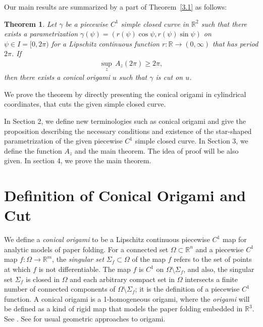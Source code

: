\documentclass{amsart}
\theoremstyle{plain}
\newtheorem*{theorem*}{Theorem}
\theoremstyle{definition}
\theoremstyle{remark}
\begin{document}
Our main results are summarized by a part of Theorem~\ref{3.1} as follows:
\begin{theorem*} %
Let $\gamma$ be a piecewise $C^1$ simple closed curve in $\mathbb{R}^2$ such that there exists a parametrization $\gamma(\psi)=(r(\psi)\cos\psi,r(\psi)\sin\psi)$ on $\psi\in I=[0,2\pi)$ for a Lipschitz continuous function $r \colon \mathbb{R}\to(0,\infty)$ that has period $2\pi$. If
\begin{align}\label{condition}%
\sup_{z}\,A_z(2\pi)\ge2\pi,
\end{align}
then there exists a conical origami $u$ such that $\gamma$ is cut on $u$.
\end{theorem*}
\noindent We prove the theorem by directly presenting the conical origami in cylindrical coordinates, that cuts the given simple closed curve.

In Section 2, we define new terminologies such as conical origami and give the proposition describing the necessary conditions and existence of the star-shaped parametrization of the given piecewise $C^1$ simple closed curve.
In Section 3, we define the function $A_z$ and the main theorem.
The idea of proof will be also given.
In section 4, we prove the main theorem.






\bigskip

\section{Definition of Conical Origami and Cut}%
We define a \emph{conical origami} to be a Lipschitz continuous piecewise $C^1$ map for analytic models of paper folding.
For a connected set $\Omega\subset\mathbb{R}^n$ and a piecewise $C^1$ map $f\colon\Omega\to\mathbb{R}^m$, the \emph{singular set} $\Sigma_f\subset\Omega$ of the map $f$ refers to the set of points at which $f$ is not differentiable.
The map $f$ is $C^1$ on $\Omega\setminus\Sigma_f$, and also, the singular set $\Sigma_f$ is closed in $\Omega$ and each arbitrary compact set in $\Omega$ intersects a finite number of connected components of $\Omega\setminus\Sigma_f$; it is the definition of a piecewise $C^1$ function.
A conical origami is a 1-homogeneous origami, where the \emph{origami} will be defined as a kind of rigid map that models the paper folding embedded in $\mathbb{R}^3$. %
See \cite{dacorogna2008lipschitz}.
See \cite{arkin2004can,hull1994mathematics,kawasaki1989relation,lang1996computational}
for usual geometric approaches to origami. 
\end{document}
